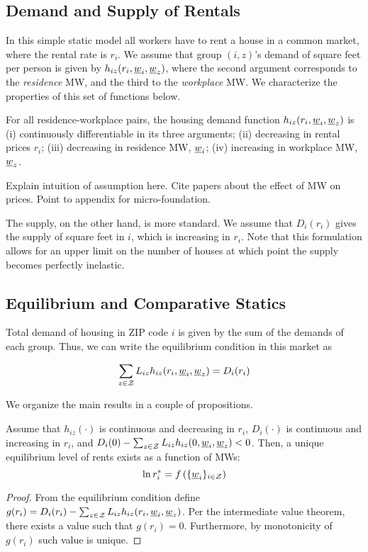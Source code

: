 \subsection{Demand and Supply of Rentals}

In this simple static model all workers have to rent a house in a common market, where 
the rental rate is $r_i$. 
We assume that group $(i,z)$'s demand of square feet per person is given by $h_{iz} (r_i, 
\underline{w}_i, \underline{w}_z)$, where the second argument corresponds to the \textit{residence} MW, and 
the third to the \textit{workplace} MW. 
We characterize the properties of this set of functions below.

\begin{assu}\label{assu:housing_function}
	For all residence-workplace pairs, the housing demand function $h_{iz} (r_i, 	
	\underline{w}_i, \underline{w}_z)$ is 
	(i) continuously differentiable in its three arguments;
	(ii) decreasing in rental prices $r_i$;
	(iii) decreasing in residence MW, $\underline{w}_i$;
	(iv) increasing in workplace MW, $\underline{w}_z$.
\end{assu}

Explain intuition of assumption here. Cite papers about the effect of MW on prices. 
Point to appendix for micro-foundation.

The supply, on the other hand, is more standard. We assume that $D_i(r_i)$ gives the 
supply of square feet in $i$, which is increasing in $r_i$. Note that this formulation 
allows for an upper limit on the number of houses at which point the supply becomes 
perfectly inelastic.

\subsection{Equilibrium and Comparative Statics}

Total demand of housing in ZIP code $i$ is given by the sum of the demands of each group. 
Thus, we can write the equilibrium condition in this market as

\begin{equation}\label{eq:equilibrium}
	\sum_{z\in\mathcal{Z}} L_{iz} h_{iz} (r_i, \underline{w}_i, \underline{w}_z) = D_i(r_i)
\end{equation}

We organize the main results in a couple of propositions.

\begin{prop}[Equilibrium]\label{prop:equilibrium}
	Assume that $h_{iz}(\cdot)$ is continuous and decreasing in $r_i$, $D_i(\cdot)$ is 
	continuous and increasing in $r_i$, and $D_i(0) - \sum_{z\in\mathcal{Z}} L_{iz} h_{iz} (0, 
	\underline{w}_i, \underline{w}_z) < 0$. Then, a unique equilibrium level of rents exists as a function of 
	MWs:
	$$\ln r_i^* =  f\left(\{\underline{w}_i\}_{i\in\mathcal{Z}}\right)$$
\end{prop}
\begin{proof}
	From the equilibrium condition define $g(r_i) = D_i(r_i) - \sum_{z\in\mathcal{Z}} L_{iz} 
	h_{iz} (r_i, \underline{w}_i, \underline{w}_z)$. Per the intermediate value theorem, there exists a value 
	such that $g(r_i) = 0$. Furthermore, by monotonicity of $g(r_i)$ such value is unique.
\end{proof}

